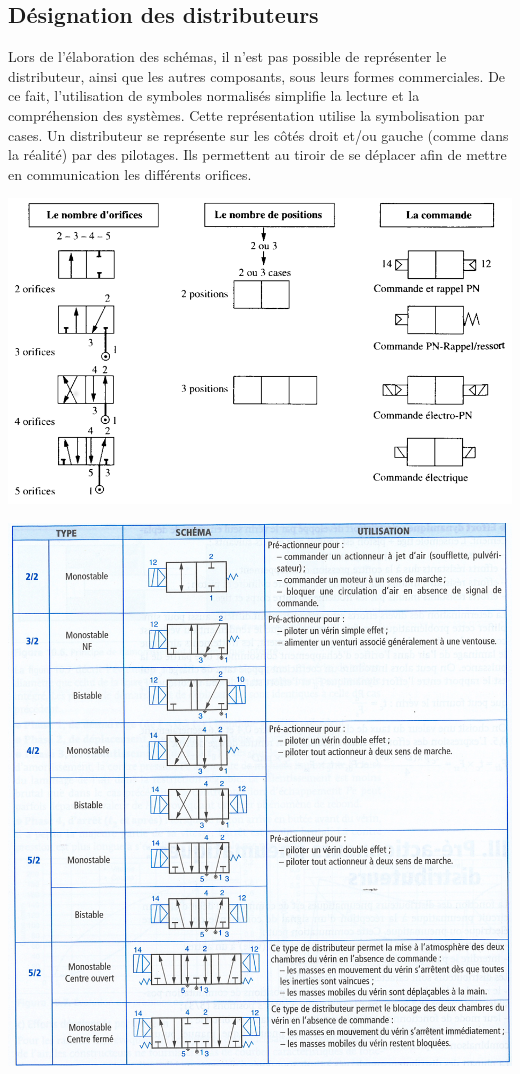\documentclass[10pt]{article}
\begin{document}
\subsection{Désignation des distributeurs}
Lors de l'élaboration des schémas, il n'est pas possible de représenter le distributeur, ainsi que les autres composants, sous leurs formes commerciales. De ce fait, l'utilisation de symboles normalisés simplifie la lecture et la compréhension des systèmes. Cette représentation utilise la symbolisation par cases.
Un distributeur se représente sur les côtés droit et/ou gauche (comme dans la réalité) par des pilotages. Ils permettent au tiroir de se déplacer afin de mettre en communication les différents orifices.

\begin{center}
\includegraphics[width=.9\textwidth]{images/Fig_10_distri}
\end{center}

\begin{center}
\includegraphics[width=.9\textwidth]{images/fig4}
\end{center}
\end{document}
